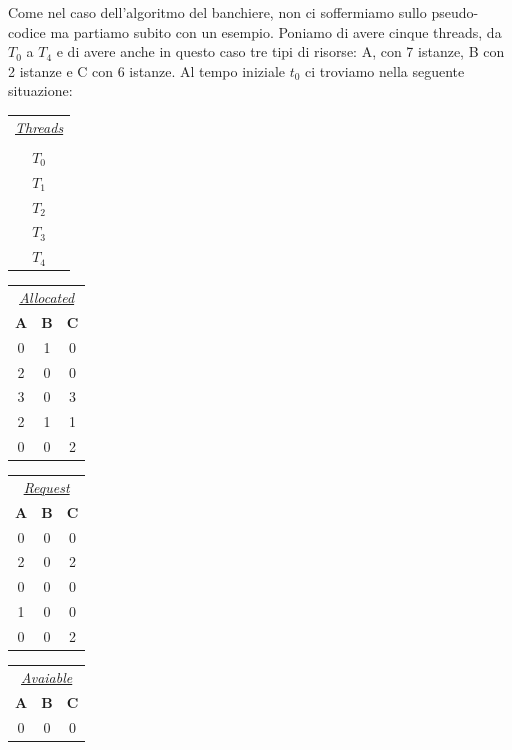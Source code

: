Come nel caso dell'algoritmo del banchiere, non ci soffermiamo sullo pseudo-codice ma partiamo subito con un esempio. Poniamo di avere cinque threads, da $T_0$ a $T_4$ e di avere anche in questo caso tre tipi di risorse: A, con 7 istanze, B con 2 istanze e C con 6 istanze. Al tempo iniziale $t_0$ ci troviamo nella seguente situazione:
\begin{table}[h]
    \centering
    \begin{tabular}{c}
         \underline{\textit{Threads}} \\\\ $T_0$ \\ $T_1$ \\ $T_2$ \\ $T_3$ \\ $T_4$
    \end{tabular}
    \begin{tabular}{c c c}
         \multicolumn{3}{c}{\underline{\textit{Allocated}}} \\
         \textbf{A} & \textbf{B} & \textbf{C} \\
         0 & 1 & 0 \\
         2 & 0 & 0 \\
         3 & 0 & 3 \\
         2 & 1 & 1 \\
         0 & 0 & 2 \\
    \end{tabular}
    \hspace{5px}
    \begin{tabular}{c c c}
         \multicolumn{3}{c}{\underline{\textit{Request}}} \\
         \textbf{A} & \textbf{B} & \textbf{C} \\
         0 & 0 & 0 \\
         2 & 0 & 2 \\
         0 & 0 & 0 \\
         1 & 0 & 0 \\
         0 & 0 & 2 \\
    \end{tabular} 
    \hspace{5pt}
    \begin{tabular}{c c c}
         \multicolumn{3}{c}{\underline{\textit{Avaiable}}} \\
         \textbf{A} & \textbf{B} & \textbf{C} \\
         0 & 0 & 0 
    \end{tabular}
\end{table}


